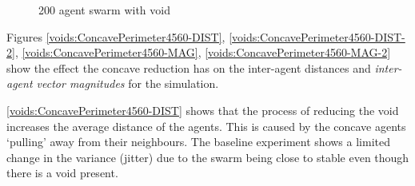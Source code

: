 \begin{figure}[H]
\centering
\caption[200 agent swarm with void]{200 agent swarm with void}
\label{fig:VoidConcaveReduction1}
\end{figure}

Figures \ref{voids:ConcavePerimeter4560-DIST}, \ref{voids:ConcavePerimeter4560-DIST-2}, \ref{voids:ConcavePerimeter4560-MAG}, \ref{voids:ConcavePerimeter4560-MAG-2} show the effect the concave reduction has on the inter-agent distances and \textit{inter-agent vector magnitudes} for the simulation. 

\autoref{voids:ConcavePerimeter4560-DIST} shows that the process of reducing the void increases the average distance of the agents. This is caused by the concave agents `pulling' away from their neighbours. The baseline experiment shows a limited change in the variance (jitter) due to the swarm being close to stable even though there is a void present. 

